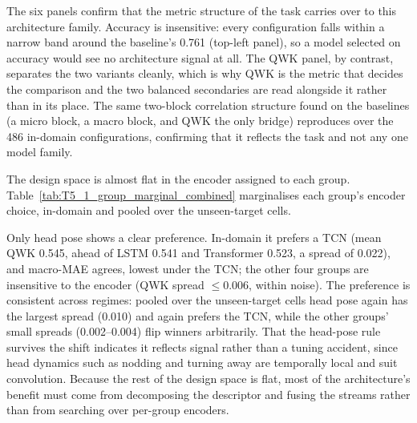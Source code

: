 \documentclass[../main.tex]{subfiles}
\begin{document}
The six panels confirm that the metric structure of the task carries over to this architecture family. Accuracy is insensitive: every configuration falls within a narrow band around the baseline's 0.761 (top-left panel), so a model selected on accuracy would see no architecture signal at all. The QWK panel, by contrast, separates the two variants cleanly, which is why QWK is the metric that decides the comparison and the two balanced secondaries are read alongside it rather than in its place. The same two-block correlation structure found on the baselines (a micro block, a macro block, and QWK the only bridge) reproduces over the 486 in-domain configurations, confirming that it reflects the task and not any one model family.

The design space is almost flat in the encoder assigned to each group. Table~\ref{tab:T5_1_group_marginal_combined} marginalises each group's encoder choice, in-domain and pooled over the unseen-target cells.

Only head pose shows a clear preference. In-domain it prefers a TCN (mean QWK 0.545, ahead of LSTM 0.541 and Transformer 0.523, a spread of 0.022), and macro-MAE agrees, lowest under the TCN; the other four groups are insensitive to the encoder (QWK spread $\le0.006$, within noise). The preference is consistent across regimes: pooled over the unseen-target cells head pose again has the largest spread (0.010) and again prefers the TCN, while the other groups' small spreads (0.002--0.004) flip winners arbitrarily. That the head-pose rule survives the shift indicates it reflects signal rather than a tuning accident, since head dynamics such as nodding and turning away are temporally local and suit convolution. Because the rest of the design space is flat, most of the architecture's benefit must come from decomposing the descriptor and fusing the streams rather than from searching over per-group encoders.
\end{document}
